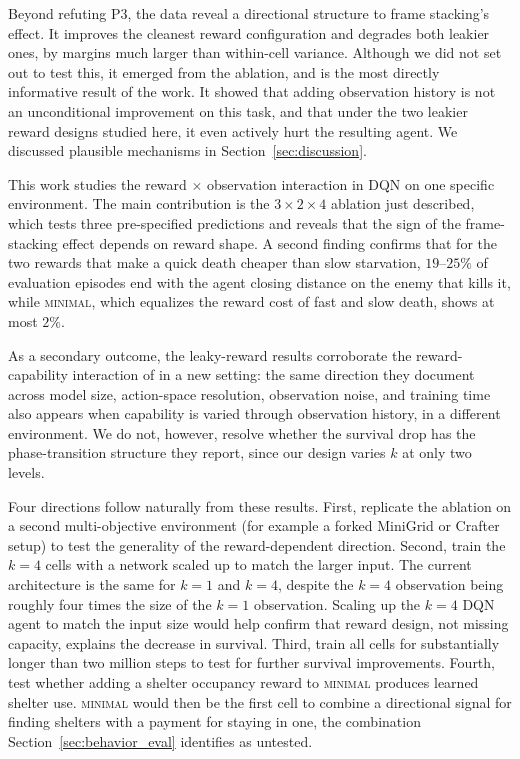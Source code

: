 \documentclass[12pt,a4paper,titlepage]{article}
\begin{document}
Beyond refuting P3, the data reveal a directional structure to frame stacking's effect. It improves the cleanest reward configuration and degrades both leakier ones, by margins much larger than within-cell variance. Although we did not set out to test this, it emerged from the ablation, and is the most directly informative result of the work. It showed that adding observation history is not an unconditional improvement on this task, and that under the two leakier reward designs studied here, it even actively hurt the resulting agent. We discussed plausible mechanisms in Section~\ref{sec:discussion}.

This work studies the reward $\times$ observation interaction in DQN on one specific environment. The main contribution is the $3 \times 2 \times 4$ ablation just described, which tests three pre-specified predictions and reveals that the sign of the frame-stacking effect depends on reward shape. A second finding confirms that for the two rewards that make a quick death cheaper than slow starvation, $19$--$25\%$ of evaluation episodes end with the agent closing distance on the enemy that kills it, while \textsc{minimal}, which equalizes the reward cost of fast and slow death, shows at most $2\%$.

As a secondary outcome, the leaky-reward results corroborate the reward-capability interaction of \citet{Pan2022} in a new setting: the same direction they document across model size, action-space resolution, observation noise, and training time also appears when capability is varied through observation history, in a different environment. We do not, however, resolve whether the survival drop has the phase-transition structure they report, since our design varies $k$ at only two levels.

\label{sec:future_work}
Four directions follow naturally from these results. First, replicate the ablation on a second multi-objective environment (for example a forked MiniGrid or Crafter setup) to test the generality of the reward-dependent direction. Second, train the $k=4$ cells with a network scaled up to match the larger input. The current architecture is the same for $k=1$ and $k=4$, despite the $k=4$ observation being roughly four times the size of the $k=1$ observation. Scaling up the $k=4$ DQN agent to match the input size would help confirm that reward design, not missing capacity, explains the decrease in survival. Third, train all cells for substantially longer than two million steps to test for further survival improvements. Fourth, test whether adding a shelter occupancy reward to \textsc{minimal} produces learned shelter use. \textsc{minimal} would then be the first cell to combine a directional signal for finding shelters with a payment for staying in one, the combination Section~\ref{sec:behavior_eval} identifies as untested.
\end{document}
